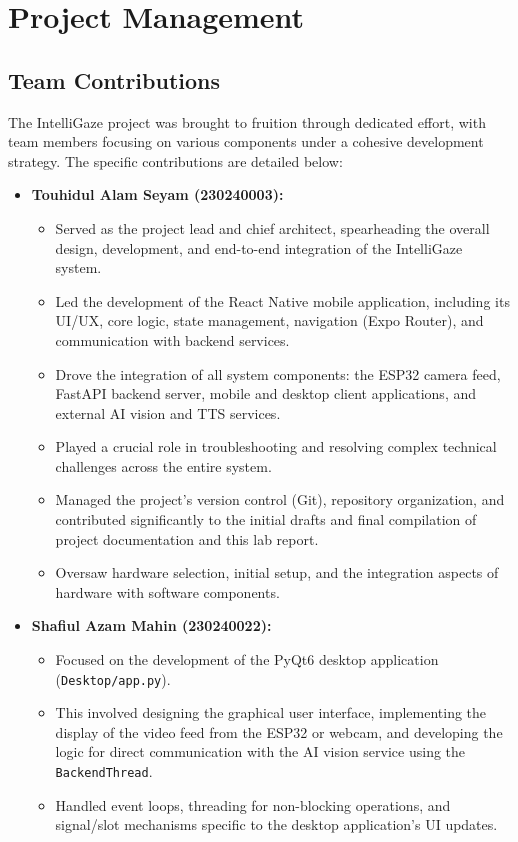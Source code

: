 \documentclass[12pt, a4paper]{report}
\begin{document}
\chapter{Project Management}

\section{Team Contributions}

The IntelliGaze project was brought to fruition through dedicated effort, with team members focusing on various components under a cohesive development strategy. The specific contributions are detailed below:

\begin{itemize}
    \item \textbf{Touhidul Alam Seyam (230240003):}
    \begin{itemize}
        \item Served as the project lead and chief architect, spearheading the overall design, development, and end-to-end integration of the IntelliGaze system.
        \item Led the development of the React Native mobile application, including its UI/UX, core logic, state management, navigation (Expo Router), and communication with backend services.
        \item Drove the integration of all system components: the ESP32 camera feed, FastAPI backend server, mobile and desktop client applications, and external AI vision and TTS services.
        \item Played a crucial role in troubleshooting and resolving complex technical challenges across the entire system.
        \item Managed the project's version control (Git), repository organization, and contributed significantly to the initial drafts and final compilation of project documentation and this lab report.
        \item Oversaw hardware selection, initial setup, and the integration aspects of hardware with software components.
    \end{itemize}

    \item \textbf{Shafiul Azam Mahin (230240022):}
    \begin{itemize}
        \item Focused on the development of the PyQt6 desktop application (\texttt{Desktop/app.py}).
        \item This involved designing the graphical user interface, implementing the display of the video feed from the ESP32 or webcam, and developing the logic for direct communication with the AI vision service using the \texttt{BackendThread}.
        \item Handled event loops, threading for non-blocking operations, and signal/slot mechanisms specific to the desktop application's UI updates.
    \end{itemize}


\end{itemize}
\end{document}
